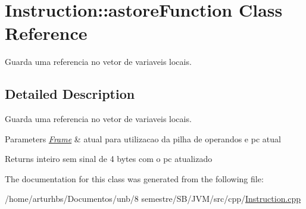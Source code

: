 \hypertarget{classInstruction_1_1astoreFunction}{}\section{Instruction\+:\+:astore\+Function Class Reference}
\label{classInstruction_1_1astoreFunction}


Guarda uma referencia no vetor de variaveis locais.  




\subsection{Detailed Description}
Guarda uma referencia no vetor de variaveis locais. 


\begin{DoxyParams}{Parameters}
{\em \hyperlink{classFrame}{Frame}} & atual para utilizacao da pilha de operandos e pc atual \\
\hline
\end{DoxyParams}
\begin{DoxyReturn}{Returns}
inteiro sem sinal de 4 bytes com o pc atualizado 
\end{DoxyReturn}


The documentation for this class was generated from the following file\+:\begin{DoxyCompactItemize}
\item 
/home/arturhbs/\+Documentos/unb/8 semestre/\+S\+B/\+J\+V\+M/src/cpp/\hyperlink{Instruction_8cpp}{Instruction.\+cpp}\end{DoxyCompactItemize}
